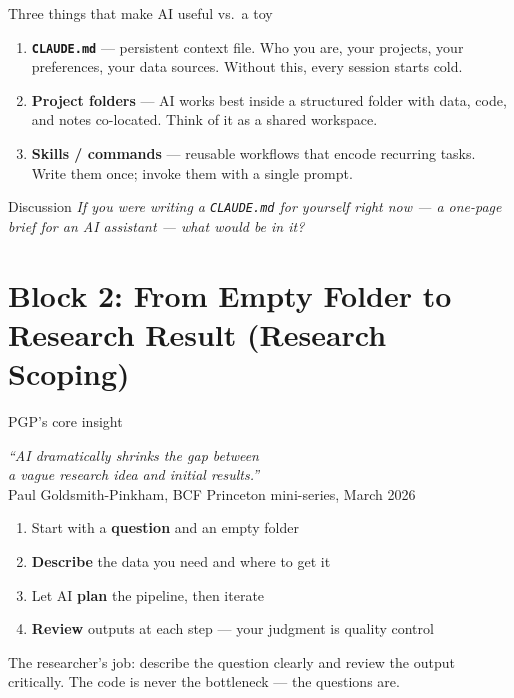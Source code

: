\documentclass[aspectratio=169, 10pt]{beamer}
\newcommand{\discussprompt}[1]{%
  \begin{alertblock}{\faComments\quad Discussion}
    \textit{#1}
  \end{alertblock}
}
\begin{document}
\begin{frame}{Three things that make AI useful vs.\ a toy}
  \begin{enumerate}
    \setlength{\itemsep}{0.8em}
    \item \textbf{\texttt{CLAUDE.md}} --- persistent context file.
          Who you are, your projects, your preferences, your data sources.
          Without this, every session starts cold.

    \item \textbf{Project folders} --- AI works best inside a structured folder
          with data, code, and notes co-located. Think of it as a shared workspace.

    \item \textbf{Skills / commands} --- reusable workflows that encode recurring
          tasks. Write them once; invoke them with a single prompt.
  \end{enumerate}

  \vfill
  \discussprompt{If you were writing a \texttt{CLAUDE.md} for yourself right now
  --- a one-page brief for an AI assistant --- what would be in it?}
\end{frame}


\section{Block 2: From Empty Folder to Research Result (Research Scoping)}

\begin{frame}{PGP's core insight}
  \begin{center}
    \textit{``AI dramatically shrinks the gap between\\
    a vague research idea and initial results.''}\\[0.3em]
    {\small Paul Goldsmith-Pinkham, BCF Princeton mini-series, March 2026}
  \end{center}

  \vspace{0.7em}
  \begin{enumerate}
    \setlength{\itemsep}{0.4em}
    \item Start with a \textbf{question} and an empty folder
    \item \textbf{Describe} the data you need and where to get it
    \item Let AI \textbf{plan} the pipeline, then iterate
    \item \textbf{Review} outputs at each step --- your judgment is quality control
  \end{enumerate}

  \vspace{0.5em}
  \begin{findingbox}
    The researcher's job: describe the question clearly and review the output
    critically. The code is never the bottleneck --- the questions are.
  \end{findingbox}
\end{frame}
\end{document}
